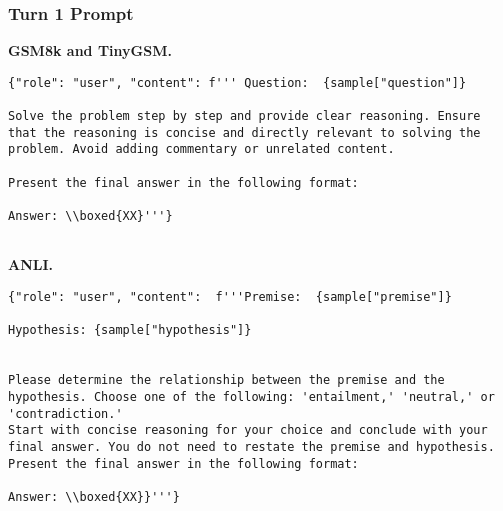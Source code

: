 \subsubsection{Turn 1 Prompt}
\textbf{GSM8k and TinyGSM. }
\begin{lstlisting}
{"role": "user", "content": f''' Question:  {sample["question"]}

Solve the problem step by step and provide clear reasoning. Ensure that the reasoning is concise and directly relevant to solving the problem. Avoid adding commentary or unrelated content.

Present the final answer in the following format:

Answer: \\boxed{XX}'''}
   
\end{lstlisting}
\vspace{2cm}
\textbf{ANLI. }
\begin{lstlisting}
{"role": "user", "content":  f'''Premise:  {sample["premise"]}

Hypothesis: {sample["hypothesis"]}


Please determine the relationship between the premise and the hypothesis. Choose one of the following: 'entailment,' 'neutral,' or 'contradiction.'
Start with concise reasoning for your choice and conclude with your final answer. You do not need to restate the premise and hypothesis. Present the final answer in the following format:

Answer: \\boxed{XX}}'''}
\end{lstlisting}

